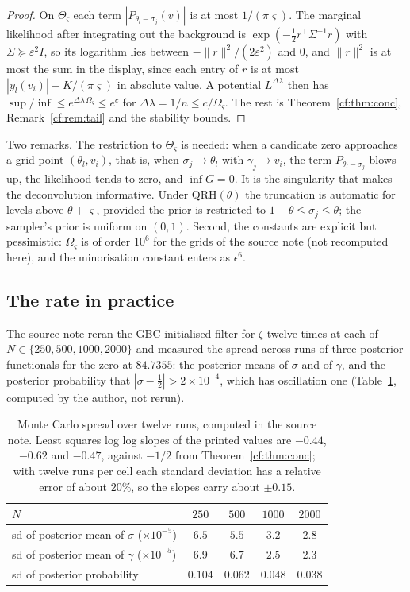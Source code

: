 \begin{proof}
On $\Theta_\varsigma$ each term $|P_{\theta_l-\sigma_j}(v)|$ is at most $1/(\pi\varsigma)$. The marginal likelihood after integrating out the background is $\exp(-\frac12r^\top\Sigma^{-1}r)$ with $\Sigma\succeq\varepsilon^2I$, so its logarithm lies between $-\|r\|^2/(2\varepsilon^2)$ and $0$, and $\|r\|^2$ is at most the sum in the display, since each entry of $r$ is at most $|y_l(v_i)|+K/(\pi\varsigma)$ in absolute value. A potential $L^{\Delta\lambda}$ then has $\sup/\inf\le e^{\Delta\lambda\,\Omega_\varsigma}\le e^c$ for $\Delta\lambda=1/n\le c/\Omega_\varsigma$. The rest is Theorem~\ref{cf:thm:conc}, Remark~\ref{cf:rem:tail} and the stability bounds.
\end{proof}

Two remarks. The restriction to $\Theta_\varsigma$ is needed: when a candidate zero approaches a grid point $(\theta_l,v_i)$, that is, when $\sigma_j\to\theta_l$ with $\gamma_j\to v_i$, the term $P_{\theta_l-\sigma_j}$ blows up, the likelihood tends to zero, and $\inf G=0$. It is the singularity that makes the deconvolution informative. Under $\mathrm{QRH}(\theta)$ the truncation is automatic for levels above $\theta+\varsigma$, provided the prior is restricted to $1-\theta\le\sigma_j\le\theta$; the sampler's prior is uniform on $(0,1)$. Second, the constants are explicit but pessimistic: $\Omega_\varsigma$ is of order $10^6$ for the grids of the source note (not recomputed here), and the minorisation constant enters as $\epsilon^6$.

\subsection{The rate in practice}

The source note reran the GBC initialised filter for $\zeta$ twelve times at each of $N\in\{250,500,1000,2000\}$ and measured the spread across runs of three posterior functionals for the zero at $84.7355$: the posterior means of $\sigma$ and of $\gamma$, and the posterior probability that $|\sigma-\frac12|>2\times10^{-4}$, which has oscillation one (Table~\ref{cf:tab:reps}, computed by the author, not rerun).

\begin{table}[h]
\centering
\begin{tabular}{lcccc}
\toprule
$N$ & $250$ & $500$ & $1000$ & $2000$\\
\midrule
sd of posterior mean of $\sigma$ ($\times10^{-5}$) & $6.5$ & $5.5$ & $3.2$ & $2.8$\\
sd of posterior mean of $\gamma$ ($\times10^{-5}$) & $6.9$ & $6.7$ & $2.5$ & $2.3$\\
sd of posterior probability & $0.104$ & $0.062$ & $0.048$ & $0.038$\\
\bottomrule
\end{tabular}
\caption{Monte Carlo spread over twelve runs, computed in the source note. Least squares log log slopes of the printed values are $-0.44$, $-0.62$ and $-0.47$, against $-1/2$ from Theorem~\ref{cf:thm:conc}; with twelve runs per cell each standard deviation has a relative error of about $20\%$, so the slopes carry about $\pm0.15$.}
\label{cf:tab:reps}
\end{table}

